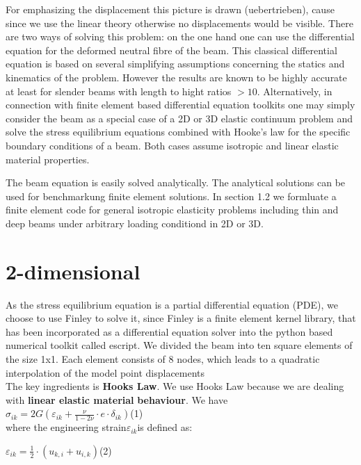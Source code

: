 For emphasizing the displacement this picture is drawn (uebertrieben),
cause since we use the linear theory otherwise no displacements would
be visible. 
There are two ways of solving this problem: on the one hand one can
use the differential equation for the deformed neutral fibre of the
beam. This classical differential equation is based on several simplifying
assumptions concerning the statics and kinematics of the problem.
However the results are known to be highly accurate at least for slender
beams with length to hight ratios $> 10$. Alternatively, in connection
with finite element based differential equation toolkits one may simply
consider the beam as a special case of a 2D or 3D elastic continuum
problem and solve the stress equilibrium equations combined with Hooke's
law for the specific boundary conditions of a beam. Both cases assume
isotropic and linear elastic material properties.

The beam equation is easily solved analytically. The analytical solutions
can be used for benchmarkung finite element solutions. In section
1.2 we formluate a finite element code for general isotropic elasticity
problems including thin and deep beams under arbitrary loading conditiond
in 2D or 3D. 


\section{2-dimensional}
As the stress equilibrium equation is a partial differential equation
(PDE), we choose to use Finley to solve it, since Finley is a finite
element kernel library, that has been incorporated as a differential
equation solver into the python based numerical toolkit called escript.
We divided the beam into ten square elements of the size 1x1. Each
element consists of 8 nodes, which leads to a quadratic interpolation
of the model point displacements \\

The key ingredients is \textbf{Hooks Law}. We use Hooks Law because
we are dealing with \textbf{linear elastic material} \textbf{behaviour}.
We have \\


$\sigma_{ik}=2G\left(\varepsilon_{ik}+\frac{\nu}{1-2\nu}\cdot e\cdot\delta_{ik}\right)$\hfill{}(1)\\
where the engineering strain$\varepsilon_{ik}$is defined as:

$\varepsilon_{ik}=\frac{1}{2}\cdot\left(u_{k,i}+u_{i,k}\right)$\hfill{}(2)\\


